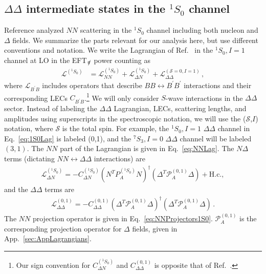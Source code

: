 \documentclass[nofootinbib, preprint, aps, prc, superscriptaddress,11pt]{revtex4-1}
\newcommand{\NN}{\ensuremath{N\!N}\xspace}
\newcommand{\oneS}{\ensuremath{{{}^{1}\!S_0}}\xspace}
\newcommand\Swave{$S$-wave\xspace}
\newcommand{\calL}{\ensuremath{\mathcal{L}}}
\newcommand{\1}{\mathbbm{1}}
\newcommand{\CNDsing}{\ensuremath{C_{\Delta N}^{(^1 \! S_0)}}\xspace}
\newcommand{\CDDoneSIone}{C_{\DD}^{(0,1)}}
\newcommand{\nopi}{\ensuremath{\pi\hskip-0.40em /}}
\newcommand{\eftnopi}{EFT$_{\nopi}$\xspace}
\newcommand{\D}{\ensuremath{\Delta}\xspace}
\newcommand{\DD}{\ensuremath{\Delta\Delta}\xspace}
\begin{document}
\subsection{\DD intermediate states in the $\oneS$ channel}
\label{sec:DDIntOneS}

Reference \cite{Savage:1996tb} analyzed \NN scattering in the \oneS channel including both nucleon and \D fields.
We summarize the parts relevant for our analysis here, but use different conventions and notation.
We write the  Lagrangian of Ref.~\cite{Savage:1996tb} in the $\oneS, I=1$ channel at LO in the \eftnopi power counting as 
\begin{align}
\label{eq:1S0Lag}
    \calL^{(\oneS)} &= \calL_{\NN}^{(\oneS)}+\calL_{\D N}^{(\oneS)}+\calL_{\DD}^{(\mathscr{S}=0,I=1)} \, ,
\end{align}
where $\calL_{B^\prime B}$ includes operators that describe $BB \leftrightarrow B^\prime B^\prime$ interactions and their corresponding LECs $C_{B^\prime B}$.\footnote{Our sign convention for $\CNDsing$ and $\CDDoneSIone$ is opposite that of Ref.~\cite{Savage:1996tb}.} 
We will only consider \Swave interactions in the \DD sector. 
Instead of labeling the \DD Lagrangian, LECs, scattering lengths, and amplitudes using superscripts in the spectroscopic notation, we will use the ($\mathscr{S}$,$I$) notation, where $\mathscr{S}$ is the total spin. For example, the $\oneS,I=1$ \DD channel in Eq.~\eqref{eq:1S0Lag} is labeled (0,1), and the $^7S_3,I=0$ \DD channel will be labeled $(3,1)$.
The \NN part of the Lagrangian is given in Eq.~\eqref{eq:NNLag}. 
The $N\D$ terms (dictating $NN \leftrightarrow \D \D$ interactions) are 
\begin{align} \label{eq:NDLagSing}
    \calL_{\D N}^{(\oneS)} = -\CNDsing (N^T P^{(\oneS)}_A N)^\dagger (\Delta^T \mathscr{P}_A^{(0,1)} \Delta) +\text{H.c.},
\end{align}
and the $\DD$ terms are 
\begin{align} \label{eq:DDLagSing}
    \calL^{(0,1)}_{\DD} = - \CDDoneSIone(\D^T \mathscr{P}_A^{(0,1)} \D)^\dagger (\D^T \mathscr{P}_A^{(0,1)} \D)\, .
\end{align}
The \NN projection operator is given in Eq.~\eqref{eq:NNProjectors1S0}. $\mathscr{P}_A^{(0,1)}$ is the corresponding projection operator for \D fields, given in App.~\ref{sec:AppLagrangians}.
\end{document}
